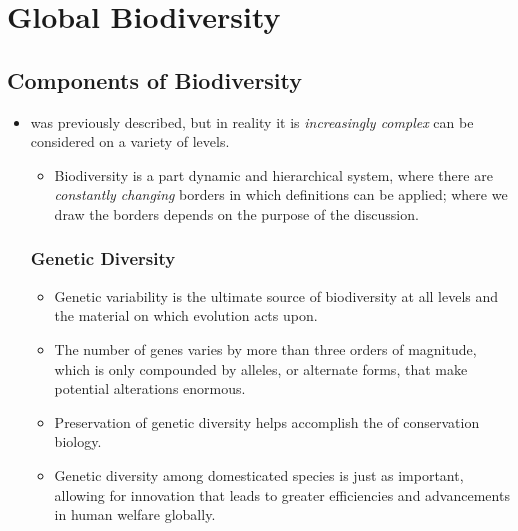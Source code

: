 \documentclass{inVerba-notes}
\begin{document}

\chapter{Global Biodiversity}\label{Global Biodiversity}
\section{Components of Biodiversity}\label{Components of Biodiversity}
\begin{itemize}
    \item \hyperref[Biodiversity]{} was previously described, but in reality it is \emph{increasingly complex} can be considered on a variety of levels.
        \begin{itemize}
            \item Biodiversity is a part dynamic and hierarchical system, where there are \emph{constantly changing} borders in which definitions can be applied; where we draw the borders depends on the purpose of the discussion. 
        \end{itemize}
    \subsection{Genetic Diversity}\label{Genetic Diversity}
    \begin{itemize}
        \item Genetic variability is the ultimate source of biodiversity at all levels and the material on which evolution acts upon.
        \item The number of genes varies by more than three orders of magnitude, which is only compounded by alleles, or alternate forms, that make potential alterations enormous.
        \item Preservation of genetic diversity helps accomplish the \hyperref[The Evolutionary Play]{} of conservation biology.
        \item Genetic diversity among domesticated species is just as important, allowing for innovation that leads to greater efficiencies and advancements in human welfare globally.
    \end{itemize}
    

\end{itemize}
\end{document}
